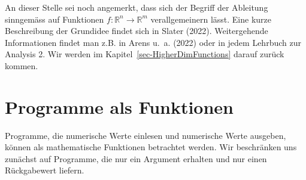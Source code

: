 \documentclass[
  a4paper,
  DIV=11]{scrreprt}
\theoremstyle{definition}
\theoremstyle{definition}
\theoremstyle{remark}
\begin{document}
An dieser Stelle sei noch angemerkt, dass sich der Begriff der Ableitung
sinngemäss auf Funktionen \(f: \mathbb{R}^n \rightarrow\mathbb{R}^m\)
verallgemeinern lässt. Eine kurze Beschreibung der Grundidee findet sich
in Slater (2022). Weitergehende Informationen findet man z.B. in Arens
u.~a. (2022) oder in jedem Lehrbuch zur Analysis 2. Wir werden im
Kapitel~\ref{sec-HigherDimFunctions} darauf zurück kommen.

\hypertarget{sec-ProgFunc}{%
\section{Programme als Funktionen}\label{sec-ProgFunc}}

Programme, die numerische Werte einlesen und numerische Werte ausgeben,
können als mathematische Funktionen betrachtet werden. Wir beschränken
uns zunächst auf Programme, die nur ein Argument erhalten und nur einen
Rückgabewert liefern.
\end{document}
